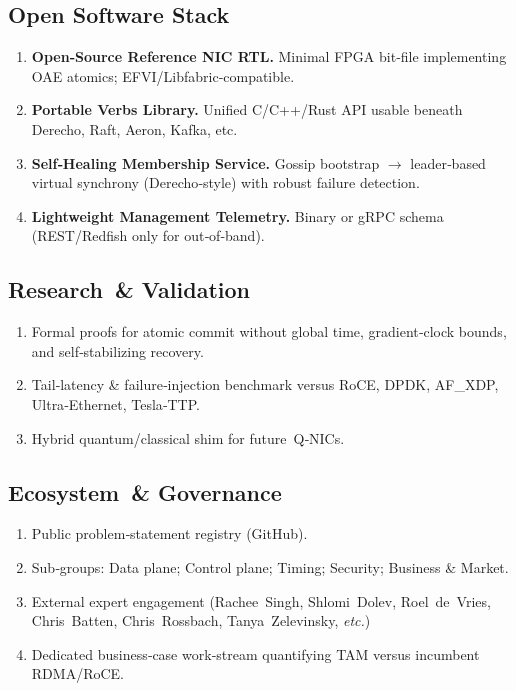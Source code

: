 \documentclass[../../../OAE-SPEC-MAIN.tex]{subfiles}
\begin{document}
\subsection{Open Software Stack}
\begin{enumerate}
\item \textbf{Open‑Source Reference NIC RTL.} Minimal FPGA bit‑file implementing OAE atomics; EFVI/Libfabric‑compatible.
\item \textbf{Portable Verbs Library.} Unified C/C++/Rust API usable beneath Derecho, Raft, Aeron, Kafka, etc.
\item \textbf{Self‑Healing Membership Service.} Gossip bootstrap $\rightarrow$ leader‑based virtual synchrony (Derecho‑style) with robust failure detection.
\item \textbf{Lightweight Management Telemetry.} Binary or gRPC schema (REST/Redfish only for out‑of‑band).
\end{enumerate}

\subsection{Research \& Validation}
\begin{enumerate}
\item Formal proofs for atomic commit without global time, gradient‑clock bounds, and self‑stabilizing recovery.
\item Tail‑latency \& failure‑injection benchmark versus RoCE, DPDK, AF\_XDP, Ultra‑Ethernet, Tesla‑TTP.
\item Hybrid quantum/classical shim for future Q‑NICs.
\end{enumerate}

\subsection{Ecosystem \& Governance}
\begin{enumerate}
\item Public problem‑statement registry (GitHub).
\item Sub‑groups: Data plane; Control plane; Timing; Security; Business \& Market.
\item External expert engagement (Rachee Singh, Shlomi Dolev, Roel de Vries, Chris Batten, Chris Rossbach, Tanya Zelevinsky, \textit{etc.})
\item Dedicated business‑case work‑stream quantifying TAM versus incumbent RDMA/RoCE.
\end{enumerate}
\end{document}
